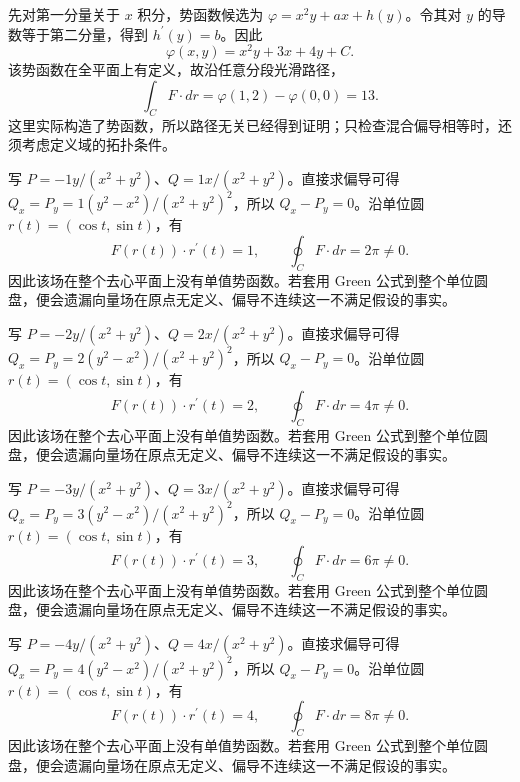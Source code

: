 \documentclass[12pt,fontset=fandol]{ctexart}
\begin{document}
\begin{solve}\label{ans:c41q19}
先对第一分量关于 $x$ 积分，势函数候选为 $\varphi=x^2y+ax+h(y)$。令其对 $y$ 的导数等于第二分量，得到 $h^{\prime}(y)=b$。因此
\[
\varphi(x,y)=x^2y+3x+4y+C.
\]
该势函数在全平面上有定义，故沿任意分段光滑路径，
\[
\int_C F\cdot dr=\varphi(1,2)-\varphi(0,0)=13.
\]
这里实际构造了势函数，所以路径无关已经得到证明；只检查混合偏导相等时，还须考虑定义域的拓扑条件。
\end{solve}

\begin{solve}\label{ans:c41q20}
写 $P=-1y/(x^2+y^2)$、$Q=1x/(x^2+y^2)$。直接求偏导可得 $Q_x=P_y=1(y^2-x^2)/(x^2+y^2)^2$，所以 $Q_x-P_y=0$。沿单位圆 $r(t)=(\cos t,\sin t)$，有
\[
F(r(t))\cdot r^{\prime}(t)=1,\qquad\oint_C F\cdot dr=2\pi\ne0.
\]
因此该场在整个去心平面上没有单值势函数。若套用 Green 公式到整个单位圆盘，便会遗漏向量场在原点无定义、偏导不连续这一不满足假设的事实。
\end{solve}

\begin{solve}\label{ans:c41q21}
写 $P=-2y/(x^2+y^2)$、$Q=2x/(x^2+y^2)$。直接求偏导可得 $Q_x=P_y=2(y^2-x^2)/(x^2+y^2)^2$，所以 $Q_x-P_y=0$。沿单位圆 $r(t)=(\cos t,\sin t)$，有
\[
F(r(t))\cdot r^{\prime}(t)=2,\qquad\oint_C F\cdot dr=4\pi\ne0.
\]
因此该场在整个去心平面上没有单值势函数。若套用 Green 公式到整个单位圆盘，便会遗漏向量场在原点无定义、偏导不连续这一不满足假设的事实。
\end{solve}

\begin{solve}\label{ans:c41q22}
写 $P=-3y/(x^2+y^2)$、$Q=3x/(x^2+y^2)$。直接求偏导可得 $Q_x=P_y=3(y^2-x^2)/(x^2+y^2)^2$，所以 $Q_x-P_y=0$。沿单位圆 $r(t)=(\cos t,\sin t)$，有
\[
F(r(t))\cdot r^{\prime}(t)=3,\qquad\oint_C F\cdot dr=6\pi\ne0.
\]
因此该场在整个去心平面上没有单值势函数。若套用 Green 公式到整个单位圆盘，便会遗漏向量场在原点无定义、偏导不连续这一不满足假设的事实。
\end{solve}

\begin{solve}\label{ans:c41q23}
写 $P=-4y/(x^2+y^2)$、$Q=4x/(x^2+y^2)$。直接求偏导可得 $Q_x=P_y=4(y^2-x^2)/(x^2+y^2)^2$，所以 $Q_x-P_y=0$。沿单位圆 $r(t)=(\cos t,\sin t)$，有
\[
F(r(t))\cdot r^{\prime}(t)=4,\qquad\oint_C F\cdot dr=8\pi\ne0.
\]
因此该场在整个去心平面上没有单值势函数。若套用 Green 公式到整个单位圆盘，便会遗漏向量场在原点无定义、偏导不连续这一不满足假设的事实。
\end{solve}
\end{document}
